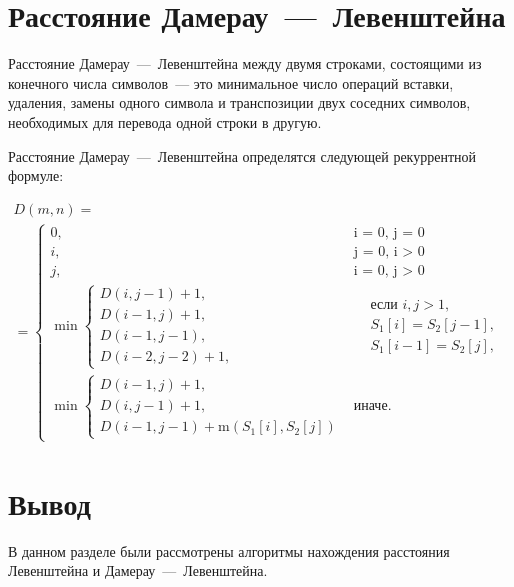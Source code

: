 \section{Расстояние Дамерау~---~Левенштейна}
Расстояние Дамерау~---~Левенштейна между двумя строками, состоящими из конечного числа символов~--- это минимальное число операций вставки, удаления, замены одного символа и транспозиции двух соседних символов, необходимых для перевода одной строки в другую.

Расстояние Дамерау~---~Левенштейна определятся следующей рекуррентной формуле:

\begin{multline}
    D(m, n) =\\ =
    \begin{cases}
        0, &\text{i = 0, j = 0}\\
        i, &\text{j = 0, i > 0}\\
        j, &\text{i = 0, j > 0}\\
        \min
        \begin{cases}
            D(i, j - 1) + 1,\\
            D(i - 1, j) + 1,\\
            D(i - 1, j - 1),\\
            D(i - 2, j - 2) + 1,
        \end{cases} 
        &\begin{aligned}
            & \text{если $i, j > 1$}, \\
            & S_{1}[i] = S_{2}[j - 1], \\
            & S_{1}[i - 1] = S_{2}[j],
        \end{aligned} \\
        \min
        \begin{cases}
            D(i - 1, j) + 1, \\
            D(i, j - 1) + 1, \\
            D(i - 1, j - 1) + \text{m}(S_1[i], S_2[j])
        \end{cases} &\text{иначе.}
    \end{cases}
    \label{eqn:recur-damlev}
\end{multline}

\section*{Вывод}
В данном разделе были рассмотрены алгоритмы нахождения расстояния Левенштейна и Дамерау~---~Левенштейна.
\clearpage


